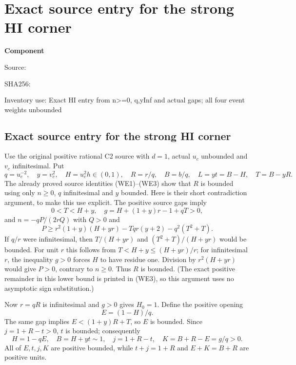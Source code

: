 \chapter{Exact source entry for the strong HI corner}
\label{component:p54b8f20ad2dd}
\noindent\textbf{Component }\par
{\small\noindent Source: \par}
{\small\noindent SHA256: \par}
{\small\noindent Inventory use: Exact HI entry from n>=0, q,yInf and actual gaps; all four event weights unbounded\par}
\medskip
\section{Exact source entry for the strong HI corner}
Use the original positive rational C2 source with $d=1$, actual
$u_c$ unbounded and $v_c$ infinitesimal. Put
\[
 q=u_c^{-2},\quad y=v_c^2,\quad H=u_c^2h\in(0,1),
 \quad R=r/q,\quad B=b/q,\quad L=yt=B-H,\quad T=B-yR.
\]
The already proved source identities (WE1)--(WE3) show that $R$ is
bounded using only $n\geq0$, $q$ infinitesimal and $y$ bounded.
Here is their short contradiction argument, to make this use
explicit. The positive source gaps imply
\[
 0<T<H+y,\quad g=H+(1+y)r-1+qT>0,
\]
and $n=-qP/(2rQ)$ with $Q>0$ and
\[
 P\ge r^2(1+y)(H+yr)-Tqr(y+2)-q^2(T^2+T).
\]
If $q/r$ were infinitesimal, then $T/(H+yr)$ and
$(T^2+T)/(H+yr)$ would be bounded. For unit $r$ this follows
from $T<H+y\le(H+yr)/r$; for infinitesimal $r$, the inequality
$g>0$ forces $H$ to have residue one. Division by $r^2(H+yr)$
would give $P>0$, contrary to $n\geq0$. Thus $R$ is bounded.
(The exact positive remainder in this lower bound is printed in
(WE3), so this argument uses no asymptotic sign substitution.)

Now $r=qR$ is infinitesimal and $g>0$ gives $H_0=1$.
Define the positive opening
\[
 E=(1-H)/q.
\]
The same gap implies
$E<(1+y)R+T$, so $E$ is bounded. Since $j=1+R-t>0$,
$t$ is bounded; consequently
\[
 H=1-qE,\quad B=H+yt\sim1,\quad
 j=1+R-t,\quad K=B+R-E=g/q>0.
\]
All of $E,t,j,K$ are positive bounded, while
$t+j=1+R$ and $E+K=B+R$ are positive units.

